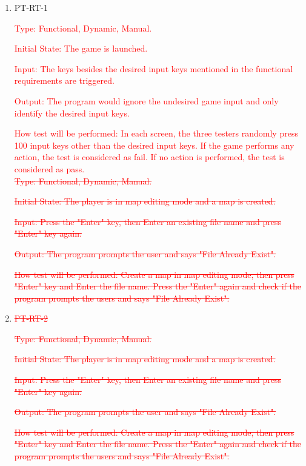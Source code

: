 \documentclass[12pt, titlepage]{article}
\begin{document}
\begin{enumerate}


\item{PT-RT-1\\}

\textcolor{red}{Type: Functional, Dynamic, Manual.}
					
\textcolor{red}{Initial State: The game is launched.}
					
\textcolor{red}{Input: The keys besides the desired input keys mentioned in the functional requirements are triggered.}
					
\textcolor{red}{Output: The program would ignore the undesired game input and only identify the desired input keys.}
					
\textcolor{red}{How test will be performed: In each screen, the three testers randomly press 100 input keys other than the desired input keys. If the game performs any action, the test is considered as fail. If no action is performed, the test is considered as pass.}\\


\textcolor{red}{\sout{Type: Functional, Dynamic, Manual.}}
					
\textcolor{red}{\sout{Initial State: The player is in map editing mode and a map is created.}}
					
\textcolor{red}{\sout{Input: Press the "Enter" key, then Enter an existing file name and press "Enter" key again.}}
					
\textcolor{red}{\sout{Output: The program prompts the user and says "File Already Exist".}}
					
\textcolor{red}{\sout{How test will be performed: Create a map in map editing mode, then press "Enter" key and Enter the file name. Press the "Enter" again and check if the program prompts the users and says "File Already Exist".}}

\item{\textcolor{red}{\sout{PT-RT-2}}\\}

\textcolor{red}{\sout{Type: Functional, Dynamic, Manual.}}
					
\textcolor{red}{\sout{Initial State: The player is in map editing mode and a map is created.}}
					
\textcolor{red}{\sout{Input: Press the "Enter" key, then Enter an existing file name and press "Enter" key again.}}
					
\textcolor{red}{\sout{Output: The program prompts the user and says "File Already Exist".}}
					
\textcolor{red}{\sout{How test will be performed: Create a map in map editing mode, then press "Enter" key and Enter the file name. Press the "Enter" again and check if the program prompts the users and says "File Already Exist".}}


\end{enumerate}
\end{document}
